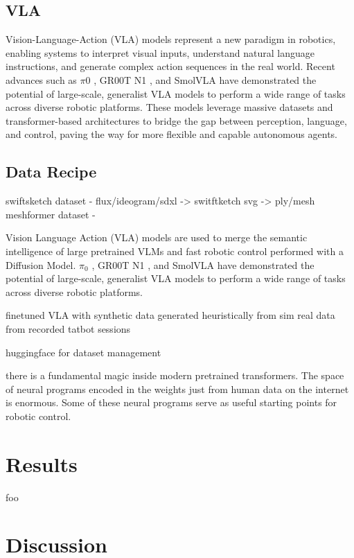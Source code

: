 \documentclass[11pt]{article}
\begin{document}
\subsection{VLA}

Vision-Language-Action (VLA) models represent a new paradigm in robotics, enabling systems to interpret visual inputs, understand natural language instructions, and generate complex action sequences in the real world.
Recent advances such as $\pi$0 \cite{Black2024pi0}, GR00T N1 \cite{Bjorck2025gr00t}, and SmolVLA \cite{Shukor2025smolvla} have demonstrated the potential of large-scale, generalist VLA models to perform a wide range of tasks across diverse robotic platforms.
These models leverage massive datasets and transformer-based architectures to bridge the gap between perception, language, and control, paving the way for more flexible and capable autonomous agents.

\subsection{Data Recipe}

swiftsketch dataset - flux/ideogram/sdxl -> switftketch svg -> ply/mesh
meshformer dataset -

Vision Language Action (VLA) models are used to merge the semantic intelligence of large pretrained VLMs and fast robotic control performed with a Diffusion Model.
$\pi_0$ \cite{Black2024pi0}, GR00T N1 \cite{Bjorck2025gr00t}, and SmolVLA \cite{Shukor2025smolvla} have demonstrated the potential of large-scale, generalist VLA models to perform a wide range of tasks across diverse robotic platforms.


finetuned VLA with 
synthetic data generated heuristically from sim
real data from recorded tatbot sessions

huggingface for dataset management

there is a fundamental magic inside modern pretrained transformers.
The space of neural programs encoded in the weights just from human data on the internet is enormous. 
Some of these neural programs serve as useful starting points for robotic control.

\section{Results}

foo

\section{Discussion}
\end{document}
